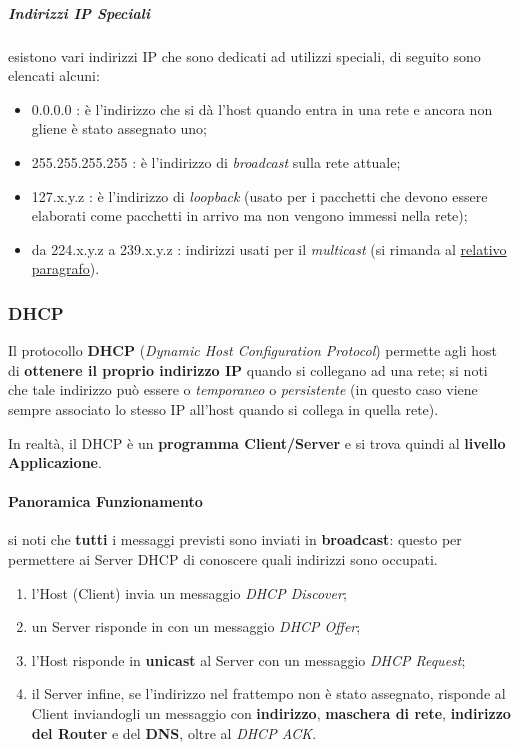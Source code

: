 \documentclass[a4paper]{article}
\begin{document}
					\subparagraph{Indirizzi IP Speciali}
						esistono vari indirizzi IP che sono dedicati ad utilizzi speciali, di seguito sono elencati alcuni:
						\begin{itemize}
							\item 0.0.0.0 : è l'indirizzo che si dà l'host quando entra in una rete e ancora non gliene è stato assegnato uno;
							\item 255.255.255.255 : è l'indirizzo di \emph{broadcast} sulla rete attuale;
							\item 127.x.y.z : è l'indirizzo di \emph{loopback} (usato per i pacchetti che devono essere elaborati come pacchetti in arrivo ma non vengono immessi nella rete);
							\item da 224.x.y.z a 239.x.y.z : indirizzi usati per il \emph{multicast} (si rimanda al \hyperref[par:multicastAddress]{relativo paragrafo}).
						\end{itemize}
						
					
			\subsubsection{DHCP}
				
				Il protocollo \textbf{DHCP} (\emph{Dynamic Host Configuration Protocol}) permette agli host di \textbf{ottenere il proprio indirizzo IP} 	quando si collegano ad una rete; si noti che tale indirizzo può essere o \emph{temporaneo} o \emph{persistente} (in questo caso viene sempre associato lo stesso IP all'host quando si collega in quella rete).
				
				In realtà, il DHCP è un \textbf{programma Client/Server} e si trova quindi al \textbf{livello Applicazione}.
				
				\paragraph{Panoramica Funzionamento}
					si noti che \textbf{tutti} i messaggi previsti sono inviati in \textbf{broadcast}: questo per permettere ai Server DHCP di conoscere quali indirizzi sono occupati.
					\begin{enumerate}
						\item l'Host (Client) invia un messaggio \emph{DHCP Discover};
						\item un Server risponde in con un messaggio \emph{DHCP Offer};
						\item l'Host risponde in \textbf{unicast} al Server con un messaggio \emph{DHCP Request};
						\item il Server infine, se l'indirizzo nel frattempo non è stato assegnato, risponde al Client inviandogli un messaggio con \textbf{indirizzo}, \textbf{maschera di rete}, \textbf{indirizzo del Router} e del \textbf{DNS}, oltre al \emph{DHCP ACK}.
					\end{enumerate}
					
\end{document}
